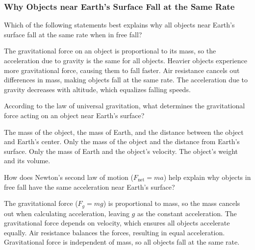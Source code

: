\documentclass[]{exam}
\theoremstyle{definition}
\begin{document}
\subsubsection*{Why Objects near Earth's Surface Fall at the
Same Rate}

\begin{questions}  


\question  
Which of the following statements best explains why all objects near Earth’s surface fall at the same rate when in free fall?  

\begin{randomizechoices}  
    \correctchoice The gravitational force on an object is proportional to its mass, so the acceleration due to gravity is the same for all objects.  
    \choice Heavier objects experience more gravitational force, causing them to fall faster.  
    \choice Air resistance cancels out differences in mass, making objects fall at the same rate.  
    \choice The acceleration due to gravity decreases with altitude, which equalizes falling speeds.  
\end{randomizechoices}  


\question  
According to the law of universal gravitation, what determines the gravitational force acting on an object near Earth’s surface?  

\begin{randomizechoices}  
    \correctchoice The mass of the object, the mass of Earth, and the distance between the object and Earth’s center.  
    \choice Only the mass of the object and the distance from Earth’s surface.  
    \choice Only the mass of Earth and the object’s velocity.  
    \choice The object’s weight and its volume.  
\end{randomizechoices}  

\question  
How does Newton’s second law of motion (\( F_{\text{net}} = ma \)) help explain why objects in free fall have the same acceleration near Earth’s surface?  

\begin{randomizechoices}  
    \correctchoice The gravitational force (\( F_g = mg \)) is proportional to mass, so the mass cancels out when calculating acceleration, leaving \( g \) as the constant acceleration.  
    \choice The gravitational force depends on velocity, which ensures all objects accelerate equally.  
    \choice Air resistance balances the forces, resulting in equal acceleration.  
    \choice Gravitational force is independent of mass, so all objects fall at the same rate.  
\end{randomizechoices}  



\end{questions}
\end{document}
